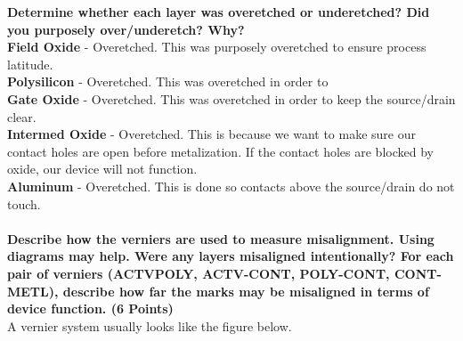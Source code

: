 \documentclass{article}
\begin{document}
\textbf{Determine whether each layer was overetched or underetched? Did you purposely
over/underetch? Why?} \\

\textbf{Field Oxide} - Overetched. This was purposely overetched to ensure process latitude. \\
\textbf{Polysilicon} - Overetched. This was overetched in order to \\
\textbf{Gate Oxide} - Overetched. This was overetched in order to keep the source/drain clear. \\
\textbf{Intermed Oxide} - Overetched. This is because we want to make sure our contact holes are open before metalization. If the contact holes are blocked by oxide, our device will not function. \\
\textbf{Aluminum} - Overetched. This is done so contacts above the source/drain do not touch. \\ \\ 
\textbf{Describe how the verniers are used to measure misalignment. Using diagrams may
help. Were any layers misaligned intentionally? For each pair of verniers (ACTVPOLY,
ACTV-CONT, POLY-CONT, CONT-METL), describe how far the marks
may be misaligned in terms of device function. (6 Points)} \\

A vernier system usually looks like the figure below.
\end{document}
